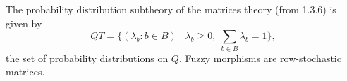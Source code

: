 The probability distribution subtheory of the matrices theory (from 1.3.6) is given by
$$QT = \{(\lambda_b : b \in B) \mid \lambda_b \geqslant 0,\; \sum_{b \in B} \lambda_b = 1\},$$
the set of probability distributions on $Q$. Fuzzy morphisms are row-stochastic matrices.
